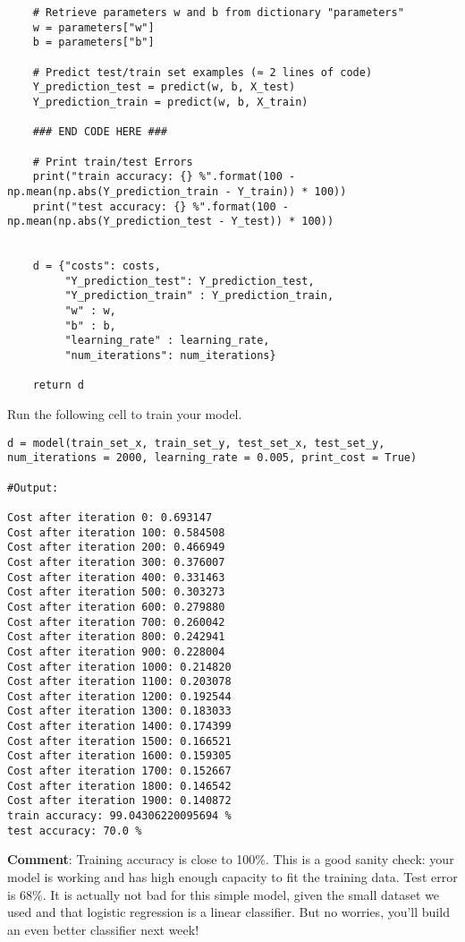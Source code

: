 {{\begin{verbatim}
    # Retrieve parameters w and b from dictionary "parameters"
    w = parameters["w"]
    b = parameters["b"]
    
    # Predict test/train set examples (≈ 2 lines of code)
    Y_prediction_test = predict(w, b, X_test)
    Y_prediction_train = predict(w, b, X_train)

    ### END CODE HERE ###

    # Print train/test Errors
    print("train accuracy: {} %".format(100 - np.mean(np.abs(Y_prediction_train - Y_train)) * 100))
    print("test accuracy: {} %".format(100 - np.mean(np.abs(Y_prediction_test - Y_test)) * 100))

    
    d = {"costs": costs,
         "Y_prediction_test": Y_prediction_test, 
         "Y_prediction_train" : Y_prediction_train, 
         "w" : w, 
         "b" : b,
         "learning_rate" : learning_rate,
         "num_iterations": num_iterations}
    
    return d
\end{verbatim}   
    
    
Run the following cell to train your model.
\begin{verbatim}
d = model(train_set_x, train_set_y, test_set_x, test_set_y, num_iterations = 2000, learning_rate = 0.005, print_cost = True)

#Output:

Cost after iteration 0: 0.693147
Cost after iteration 100: 0.584508
Cost after iteration 200: 0.466949
Cost after iteration 300: 0.376007
Cost after iteration 400: 0.331463
Cost after iteration 500: 0.303273
Cost after iteration 600: 0.279880
Cost after iteration 700: 0.260042
Cost after iteration 800: 0.242941
Cost after iteration 900: 0.228004
Cost after iteration 1000: 0.214820
Cost after iteration 1100: 0.203078
Cost after iteration 1200: 0.192544
Cost after iteration 1300: 0.183033
Cost after iteration 1400: 0.174399
Cost after iteration 1500: 0.166521
Cost after iteration 1600: 0.159305
Cost after iteration 1700: 0.152667
Cost after iteration 1800: 0.146542
Cost after iteration 1900: 0.140872
train accuracy: 99.04306220095694 %
test accuracy: 70.0 %
\end{verbatim}


{\textbf {Comment}}: Training accuracy is close to 100\%. This is a good sanity check: your model is working and has high enough capacity to fit the training data. Test error is 68\%. It is actually not bad for this simple model, given the small dataset we used and that logistic regression is a linear classifier. But no worries, you'll build an even better classifier next week!

}}
